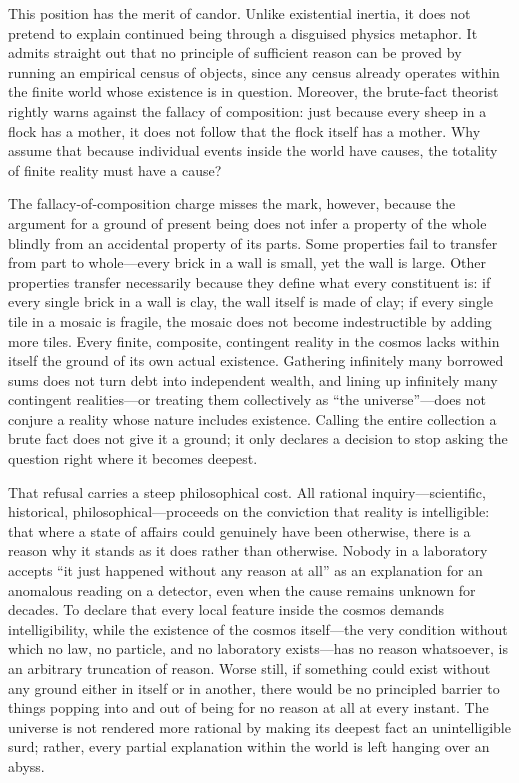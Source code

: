 This position has the merit of candor. Unlike existential inertia, it does not pretend to explain continued being through a disguised physics metaphor. It admits straight out that no principle of sufficient reason can be proved by running an empirical census of objects, since any census already operates within the finite world whose existence is in question. Moreover, the brute-fact theorist rightly warns against the fallacy of composition: just because every sheep in a flock has a mother, it does not follow that the flock itself has a mother. Why assume that because individual events inside the world have causes, the totality of finite reality must have a cause?

The fallacy-of-composition charge misses the mark, however, because the argument for a ground of present being does not infer a property of the whole blindly from an accidental property of its parts. Some properties fail to transfer from part to whole---every brick in a wall is small, yet the wall is large. Other properties transfer necessarily because they define what every constituent is: if every single brick in a wall is clay, the wall itself is made of clay; if every single tile in a mosaic is fragile, the mosaic does not become indestructible by adding more tiles. Every finite, composite, contingent reality in the cosmos lacks within itself the ground of its own actual existence. Gathering infinitely many borrowed sums does not turn debt into independent wealth, and lining up infinitely many contingent realities---or treating them collectively as ``the universe''---does not conjure a reality whose nature includes existence. Calling the entire collection a brute fact does not give it a ground; it only declares a decision to stop asking the question right where it becomes deepest.

That refusal carries a steep philosophical cost. All rational inquiry---scientific, historical, philosophical---proceeds on the conviction that reality is intelligible: that where a state of affairs could genuinely have been otherwise, there is a reason why it stands as it does rather than otherwise. Nobody in a laboratory accepts ``it just happened without any reason at all'' as an explanation for an anomalous reading on a detector, even when the cause remains unknown for decades. To declare that every local feature inside the cosmos demands intelligibility, while the existence of the cosmos itself---the very condition without which no law, no particle, and no laboratory exists---has no reason whatsoever, is an arbitrary truncation of reason. Worse still, if something could exist without any ground either in itself or in another, there would be no principled barrier to things popping into and out of being for no reason at all at every instant. The universe is not rendered more rational by making its deepest fact an unintelligible surd; rather, every partial explanation within the world is left hanging over an abyss.

